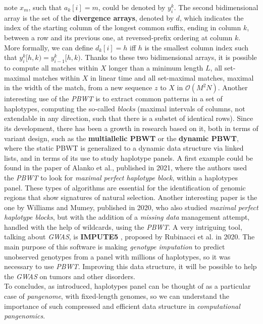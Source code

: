 \documentclass[a4paper,11pt, oneside]{article}
\begin{document}
note $x_m$, such that $a_k[i]=m$, could be denoted by $y_i^k$. The second
bidimensional array is the set of the \textbf{divergence arrays}, denoted by
$d$, which indicates the index of the starting column of the longest common
suffix, ending in column $k$, between a row and its previous one, at
reversed-prefix ordering at column $k$. More formally, we can define $d_k[i]=h$
iff $h$ is the smallest column index such that $y_i^k[h,k)=y_{i-1}^k[h,k)$. 
Thanks to these two bidimensional arrays, it is possible to compute all matches
within $X$ longer than a minimum length $L$, all set-maximal matches within $X$
in linear time and all set-maximal matches, maximal in the width of the match,
from a new sequence $z$ to $X$ in $\mathcal{O}(M^2N)$. Another interesting use
of the \textit{PBWT} is to extract common patterns in a set of
haplotypes, computing the so-called \textit{blocks} (maximal intervals of
columns, not extendable in any direction, such that there is a substet of
identical rows).
Since its development, there has been a growth in
research based on it, both in terms of variant design, such as the
\textbf{multiallelic PBWT} or the \textbf{dynamic PBWT}, where the static PBWT
is generalized to a dynamic data 
structure via linked lists, and in terms of its use to study haplotype panels.
A first example could be found in the paper of Alanko et al., published in
2021, where the authors used the \textit{PBWT} to look for \textit{maximal
  perfect haplotype block}, within a haplotypes panel. These types of
algorithms are essential for the identification of genomic regions that show
signatures of natural selection.
Another interesting paper is the one by Williams and Mumey, published in 2020,
who also studied \textit{maximal perfect haplotype blocks}, but with the
addition of a \textit{missing data} management attempt, handled with the help of
wildcards, using the \textit{PBWT}. 
A very intriguing tool, talking about \textit{GWAS}, is
\textbf{IMPUTE5} \cite{impute5}, proposed by Rubinacci et al. in 2020. The main
purpose of this 
software is making \textit{genotype imputation} to predict unobserved
genotypes from a panel with millions of haplotypes, so it was necessary to use
\textit{PBWT}. Improving this data structure, it will be possible to help the
\textit{GWAS} on tumors and other disorders.\\
To concludes, as introduced,
haplotypes panel can be thought of as a particular case of  
\textit{pangenome}, with fixed-length genomes, so we can understand the
importance of such compressed and efficient data structure in
\textit{computational pangenomics}. 
\end{document}
